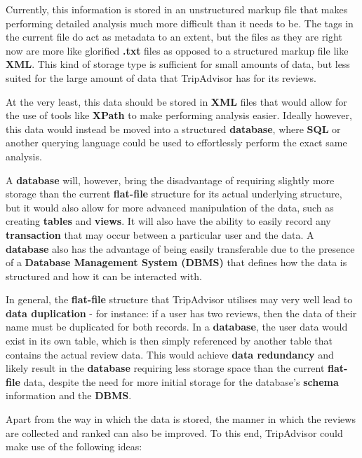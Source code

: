 \documentclass{article}
\begin{document}
	Currently, this information is stored in an unstructured markup file that makes performing detailed analysis much more difficult than it needs to be. The tags in the current file do act as metadata to an extent, but the files as they are right now are more like glorified \textbf{.txt} files as opposed to a structured markup file like \textbf{XML}. This kind of storage type is sufficient for small amounts of data, but less suited for the large amount of data that TripAdvisor has for its reviews. 
	
	At the very least, this data should be stored in \textbf{XML} files that would allow for the use of tools like \textbf{XPath} to make performing analysis easier. Ideally however, this data would instead be moved into a structured \textbf{database}, where \textbf{SQL} or another querying language could be used to effortlessly perform the exact same analysis.
	
	A \textbf{database} will, however, bring the disadvantage of requiring slightly more storage than the current \textbf{flat-file} structure for its actual underlying structure, but it would also allow for more advanced manipulation of the data, such as creating \textbf{tables} and \textbf{views}. It will also have the ability to easily record any \textbf{transaction} that may occur between a particular user and the data. A \textbf{database} also has the advantage of being easily transferable due to the presence of a \textbf{Database Management System (DBMS)} that defines how the data is structured and how it can be interacted with.
	
	In general, the \textbf{flat-file} structure that TripAdvisor utilises may very well lead to \textbf{data duplication} - for instance: if a user has two reviews, then the data of their name must be duplicated for both records. In a \textbf{database}, the user data would exist in its own table, which is then simply referenced by another table that contains the actual review data. This would achieve \textbf{data redundancy} and likely result in the \textbf{database} requiring less storage space than the current \textbf{flat-file} data, despite the need for more initial storage for the database's \textbf{schema} information and the \textbf{DBMS}.
	
	\newpage
	Apart from the way in which the data is stored, the manner in which the reviews are collected and ranked can also be improved. To this end, TripAdvisor could make use of the following ideas:
	
\end{document}
